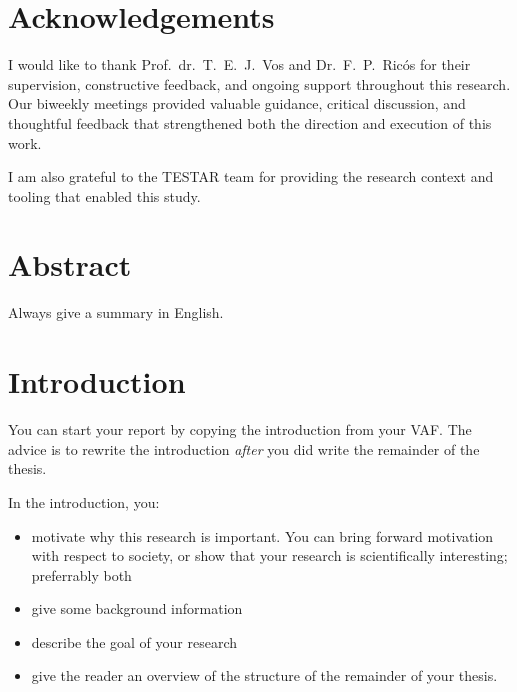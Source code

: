 \documentclass[oneside]{ou-report}
\begin{document}
\frontmatter

\chapter{Acknowledgements}

I would like to thank Prof.\ dr.\ T.\ E.\ J.\ Vos and Dr.\ F.\ P.\ Ric\'os for their supervision, constructive feedback, and ongoing support throughout this research. Our biweekly meetings provided valuable guidance, critical discussion, and thoughtful feedback that strengthened both the direction and execution of this work.

I am also grateful to the TESTAR team for providing the research context and tooling that enabled this study.

\chapter{Abstract}

Always give a summary in English.

\tableofcontents

\listoffigures

\listoftables

\mainmatter

\chapter{Introduction}
You can start your report by copying the introduction from your VAF. The advice is to rewrite the introduction \emph{after} you did write the remainder of the thesis.

In the introduction, you:

\begin{itemize}
	\item motivate why this research is important. You can bring forward motivation with respect to society, or show that your research is scientifically interesting; preferrably both
	\item give some background information
	\item describe the goal of your research
	\item give the reader an overview of the structure of the remainder of your thesis.
\end{itemize}
\end{document}

